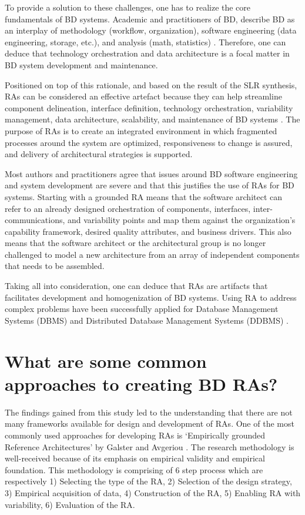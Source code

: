 \documentclass{ieeeaccess}
\begin{document}
To provide a solution to these challenges, one has to realize the core fundamentals of BD systems. Academic and practitioners of BD, describe BD as an interplay of methodology (workflow, organization), software engineering (data engineering, storage, etc.), and analysis (math, statistics) \cite{akhtar2019big}\cite{AtaeiBigDataEnvirons}. Therefore, one can deduce that technology orchestration and data architecture is a focal matter in BD system development and maintenance.

Positioned on top of this rationale, and based on the result of the SLR synthesis, RAs can be considered an effective artefact because they can help streamline component delineation, interface definition, technology orchestration, variability management, data architecture, scalability, and maintenance of BD systems \cite{Chang}\cite{Nadal}. The purpose of RAs is to create an integrated environment in which fragmented processes around the system are optimized, responsiveness to change is assured, and delivery of architectural strategies is supported. 

Most authors and practitioners agree that issues around BD software engineering and system development are severe and that this justifies the use of RAs for BD systems. Starting with a grounded RA means that the software architect can refer to an already designed orchestration of components, interfaces, inter-communications, and variability points and map them against the organization’s capability framework, desired quality attributes, and business drivers. This also means that the software architect or the architectural group is no longer challenged to model a new architecture from an array of independent components that needs to be assembled.

Taking all into consideration, one can deduce that RAs are artifacts that facilitates development and homogenization of BD systems. Using RA to address complex problems have been successfully applied for Database Management Systems (DBMS) \cite{pineiro2019big} and Distributed Database Management Systems (DDBMS) \cite{rahimi2010distributed}.

\section{What are some common approaches to creating BD RAs?}

The findings gained from this study led to the understanding that there are not many frameworks available for design and development of RAs. One of the most commonly used approaches for developing RAs is ‘Empirically grounded Reference Architectures’ by Galster and Avgeriou \cite{galster2011empirically}. The research methodology is well-received because of its emphasis on empirical validity and empirical foundation. This methodology is comprising of 6 step process which are respectively 1) Selecting the type of the RA, 2) Selection of the design strategy, 3) Empirical acquisition of data, 4) Construction of the RA, 5) Enabling RA with variability, 6) Evaluation of the RA.
\end{document}
